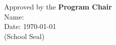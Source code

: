 \vspace*{0.3in}
\begin{flushleft}
    Approved by the \textbf{Program Chair \degreename} \\
    Name:                                              \\
    Date: \today                                       \\
    \vspace{0.1in}
    (School Seal)                                      \\
\end{flushleft}

\clearpage

\begin{center}
    \vspace*{0.6in}
    \\
\end{center}

\paragraph{}
\lipsum[2]

\clearpage

\begin{center}
    \vspace*{0.6in}
    \\
\end{center}

\paragraph{}
\lipsum[2-3]

\clearpage
\tableofcontents
\listoftables
{}

\listoffigures
{}
\clearpage
